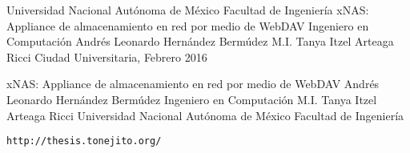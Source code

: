 \documentclass[dvips,letterpaper,12pt,twoside,spanish,headsepline,headinclude]{report}
\begin{document}


{
\pagestyle{empty}
\thesistitle
	{Universidad Nacional Aut\'{o}noma de M\'{e}xico}
	{Facultad de Ingenier\'{i}a}
	{xNAS: Appliance de almacenamiento en red por medio de WebDAV}
	{Ingeniero en Computaci\'{o}n}
	{Andr\'{e}s Leonardo Hern\'{a}ndez Berm\'{u}dez}
	{M.I. Tanya Itzel Arteaga Ricci}
	{Ciudad Universitaria, Febrero 2016}

\thesispdfinfo
	{xNAS: Appliance de almacenamiento en red por medio de WebDAV}
	{Andr\'{e}s Leonardo Hern\'{a}ndez Berm\'{u}dez}
	{Ingeniero en Computaci\'{o}n}
	{M.I. Tanya Itzel Arteaga Ricci}
	{Universidad Nacional Aut\'{o}noma de M\'{e}xico}
	{Facultad de Ingenier\'{i}a}

 
 
 
%	
 
 
}

{
\pagestyle{headings}






\appendix

}
{
{}  
\label{chap:glossary}
\printglossary[title=Glosario,toctitle=Glosario]
}
{

}
{
\newpage\null\thispagestyle{empty}\newpage
}
{
\thispagestyle{empty}
\clearpage
 \vspace*{\fill}
  \begin{center}
   \texttt{http://thesis.tonejito.org/}
  \end{center}
 \vfill %
\clearpage
}
\end{document}
